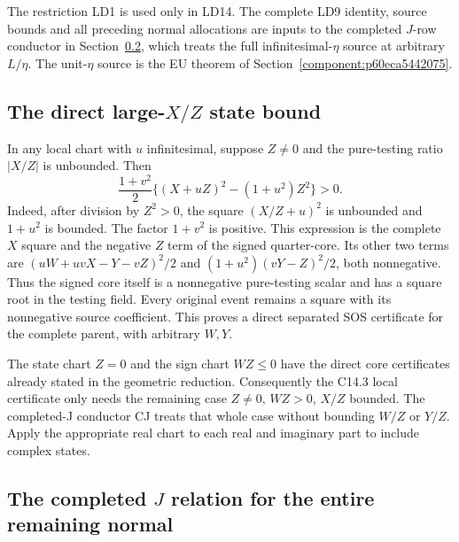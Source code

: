 The restriction LD1 is used only in LD14. The complete LD9 identity, source bounds and all preceding normal allocations are inputs to the completed $J$-row conductor in Section~\ref{component:pe3bbfd3a8151}, which treats the full infinitesimal-$\eta$ source at arbitrary $L/\eta$. The unit-$\eta$ source is the EU theorem of Section~\ref{component:p60eca5442075}.



\subsection{The direct large-$X/Z$ state bound}

\label{component:p8cfada778490}

In any local chart with $u$ infinitesimal, suppose $Z\ne0$ and
the pure-testing ratio $|X/Z|$ is unbounded.  Then
\[
 \frac{1+v^2}{2}\{(X+uZ)^2-(1+u^2)Z^2\}>0.             \tag{DS3}
\]
Indeed, after division by $Z^2>0$, the square $(X/Z+u)^2$
is unbounded and $1+u^2$ is bounded.  The factor $1+v^2$
is positive.  This expression is the complete $X$ square and the
negative $Z$ term of the signed quarter-core.  Its other two
terms are $(uW+uvX-Y-vZ)^2/2$ and
$(1+u^2)(vY-Z)^2/2$, both nonnegative.  Thus the signed core
itself is a nonnegative pure-testing scalar and has a square root
in the testing field.  Every original event remains a square with
its nonnegative source coefficient.  This proves a direct separated
SOS certificate for the complete parent, with arbitrary $W,Y$.

The state chart $Z=0$ and the sign chart $WZ\le0$ have the
direct core certificates already stated in the geometric reduction.
Consequently the C14.3 local certificate only needs the remaining
case $Z\ne0$, $WZ>0$, $X/Z$ bounded.  The completed-J
conductor CJ treats that whole case without bounding $W/Z$ or
$Y/Z$.  Apply the appropriate real chart to each real and imaginary
part to include complex states.



\subsection{The completed $J$ relation for the entire remaining normal}

\label{component:pe3bbfd3a8151}

\label{pe3bbfd3a8151:sec:r18-completed-j}

